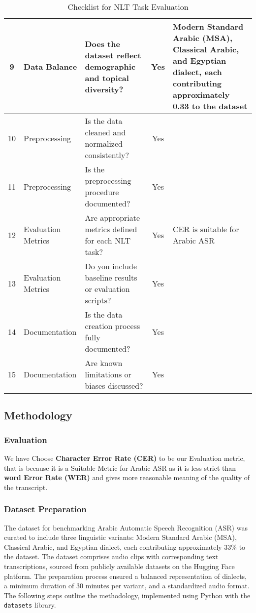\documentclass[12pt]{article}
\begin{document}
\begin{table}[H]
{\begin{tabular}{|c|p{3cm}|p{6cm}|c|p{4cm}|}
9 & Data Balance & Does the dataset reflect demographic and topical diversity? & Yes & Modern Standard Arabic (MSA), Classical Arabic, and Egyptian dialect, each contributing approximately 0.33 to the dataset \\ \hline
10 & Preprocessing & Is the data cleaned and normalized consistently? & Yes & \\ \hline
11 & Preprocessing & Is the preprocessing procedure documented? & Yes & \\ \hline
12 & Evaluation Metrics & Are appropriate metrics defined for each NLT task? & Yes & CER is suitable for Arabic ASR \\ \hline
13 & Evaluation Metrics & Do you include baseline results or evaluation scripts? & Yes & \\ \hline
14 & Documentation & Is the data creation process fully documented? & Yes & \\ \hline
15 & Documentation & Are known limitations or biases discussed? & Yes & \\ \hline
\end{tabular}%
}
\caption{Checklist for NLT Task Evaluation}
\label{tab:checklist}
\end{table}

\subsection{Methodology}

\subsubsection{Evaluation}
We have Choose \textbf{Character Error Rate (CER)} to be our Evaluation metric, that is because it is a Suitable Metric for Arabic ASR as it is less strict than \textbf{word Error Rate (WER)} and gives more reasonable meaning of the quality of the transcript.

\subsubsection{Dataset Preparation}

The dataset for benchmarking Arabic Automatic Speech Recognition (ASR) was curated to include three linguistic variants: Modern Standard Arabic (MSA), Classical Arabic, and Egyptian dialect, each contributing approximately 33\% to the dataset. The dataset comprises audio clips with corresponding text transcriptions, sourced from publicly available datasets on the Hugging Face platform. The preparation process ensured a balanced representation of dialects, a minimum duration of 30 minutes per variant, and a standardized audio format. The following steps outline the methodology, implemented using Python with the \texttt{datasets} library.
\end{document}
